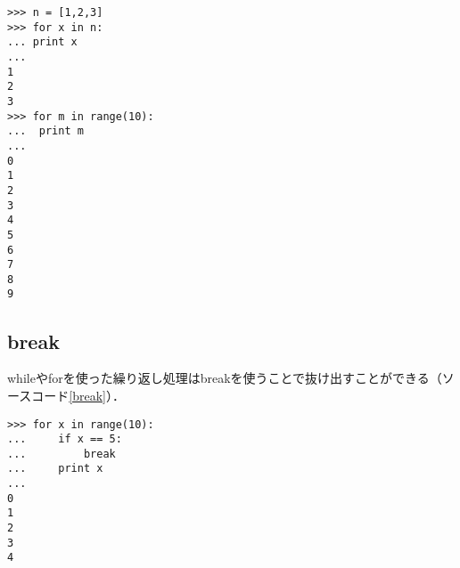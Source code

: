 \begin{lstlisting}[caption=forの使い方, label=for]
>>> n = [1,2,3]
>>> for x in n:
...	print x 	
...
1
2
3
>>> for m in range(10):
...	 print m
...
0
1
2
3
4
5
6
7
8
9
\end{lstlisting}


\subsection{break}
whileやforを使った繰り返し処理はbreakを使うことで抜け出すことができる（ソースコード\ref{break}）．
\begin{lstlisting}[caption=break, label=break]
>>> for x in range(10):
... 	if x == 5:
... 		break
... 	print x
...
0
1
2
3
4
\end{lstlisting}

